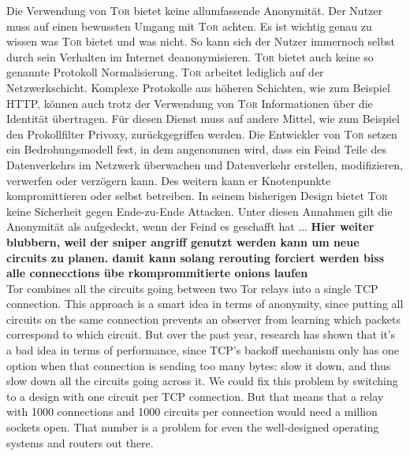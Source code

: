 \documentclass[fleqn,envcountsame,runningheads,10pt,a4paper]{llncs}
\begin{document}
Die Verwendung von \textsc{Tor} bietet keine allumfassende Anonymität. Der Nutzer muss auf einen bewussten Umgang mit \textsc{Tor} achten. Es ist wichtig genau zu wissen was \textsc{Tor} bietet und was nicht. So kann sich der Nutzer immernoch selbst durch sein Verhalten im Internet deanonymisieren. \textsc{Tor} bietet auch keine so genannte Protokoll Normalisierung. \textsc{Tor} arbeitet lediglich auf der Netzwerkschicht. Komplexe Protokolle aus höheren Schichten, wie zum Beispiel HTTP, können auch trotz der Verwendung von \textsc{Tor} Informationen über die Identität übertragen. Für diesen Dienst muss auf andere Mittel, wie zum Beispiel den Prokollfilter Privoxy, zurückgegriffen werden. Die Entwickler von \textsc{Tor} setzen ein Bedrohungsmodell fest, in dem angenommen wird, dass ein Feind Teile des Datenverkehrs im Netzwerk überwachen und Datenverkehr erstellen, modifizieren, verwerfen oder verzögern kann. Des weitern kann er Knotenpunkte kompromittieren oder selbst betreiben. In seinem bisherigen Design bietet \textsc{Tor} keine Sicherheit gegen Ende-zu-Ende Attacken\cite{tor}. Unter diesen Annahmen gilt die Anonymität als aufgedeckt, wenn der Feind es geschafft hat ... \textbf{Hier weiter blubbern, weil der sniper angriff genutzt werden kann um neue circuits zu planen. damit kann solang rerouting forciert werden biss alle connecctions übe rkomprommitierte onions laufen}\\


Tor combines all the circuits going between two Tor relays into a single TCP connection. This approach is a
smart idea in terms of anonymity, since putting all circuits on the same connection prevents an observer from
learning which packets correspond to which circuit. But over the past year, research has shown that it’s a
bad idea in terms of performance, since TCP’s backoff mechanism only has one option when that connection
is sending too many bytes: slow it down, and thus slow down all the circuits going across it.
We could fix this problem by switching to a design with one circuit per TCP connection. But that means
that a relay with 1000 connections and 1000 circuits per connection would need a million sockets open. That
number is a problem for even the well-designed operating systems and routers out there.\cite{tor_improvements}



\nocite{rfc:socks}
\nocite{rfc:ipsec}
\nocite{rfc:tls}
\nocite{tor}
\nocite{pctcp}
\nocite{tcp-over-dtls}
\nocite{imux}
\nocite{tor_improvements}


\end{document}
